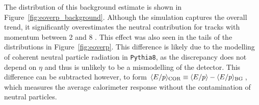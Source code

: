 The distribution of this background estimate is shown in Figure~\ref{fig:eoverp_background}. 
Although the simulation captures the overall trend, it significantly overestimates the neutral contribution for tracks with momentum between 2 and 8 \GeV.
This effect was also seen in the tails of the \ep distributions in Figure~\ref{fig:eoverp}.
This difference is likely due to the modelling of coherent neutral particle radiation in \texttt{Pythia8}, as the discrepancy does not depend on $\eta$ and thus is unlikely to be a mismodelling of the detector.
This difference can be subtracted however, to form $\langle E/p \rangle_{\mathrm{COR}} \equiv \langle E/p \rangle - \langle E/p \rangle_{\mathrm{BG}}$, which measures the average calorimeter response without the contamination of neutral particles.

\begin{figure}[htbp]
\centering
{}
~
\\
\end{figure}

